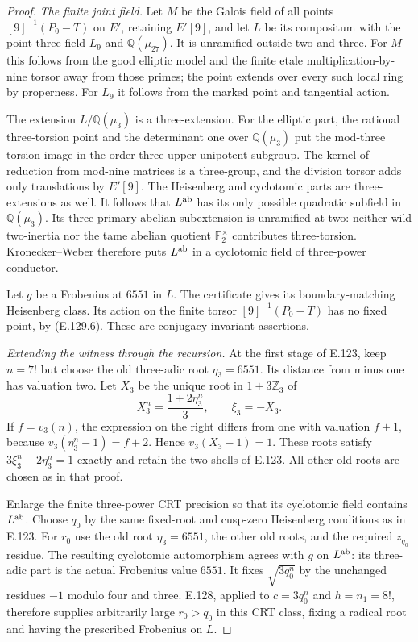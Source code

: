 \begin{proof}
\emph{The finite joint field.}
Let $M$ be the Galois field of all points
$[9]^{-1}(P_0-T)$ on $E'$, retaining $E'[9]$,
and let $L$ be its compositum with the point-three
field $L_9$ and $\mathbb Q(\mu_{27})$.
It is unramified outside two and three. For $M$
this follows from the good elliptic model and the
finite etale multiplication-by-nine torsor away
from those primes; the point extends over every
such local ring by properness. For $L_9$ it follows
from the marked point and tangential action.

The extension $L/\mathbb Q(\mu_3)$ is a
three-extension. For the elliptic part, the rational
three-torsion point and the determinant one over
$\mathbb Q(\mu_3)$ put the mod-three torsion image
in the order-three upper unipotent subgroup.
The kernel of reduction from mod-nine matrices is
a three-group, and the division torsor adds only
translations by $E'[9]$. The Heisenberg and
cyclotomic parts are three-extensions as well.
It follows that $L^{\rm ab}$ has its only possible
quadratic subfield in $\mathbb Q(\mu_3)$.
Its three-primary abelian subextension is unramified
at two: neither wild two-inertia nor the tame
abelian quotient $\mathbb F_2^\times$ contributes
three-torsion. Kronecker--Weber therefore puts
$L^{\rm ab}$ in a cyclotomic field of three-power
conductor.

Let $g$ be a Frobenius at $6551$ in $L$.
The certificate gives its boundary-matching
Heisenberg class. Its action on the finite torsor
$[9]^{-1}(P_0-T)$ has no fixed point, by (E.129.6).
These are conjugacy-invariant assertions.

\emph{Extending the witness through the recursion.}
At the first stage of E.123, keep $n=7!$ but choose
the old three-adic root $\eta_3=6551$. Its distance
from minus one has valuation two. Let $X_3$ be the
unique root in $1+3\mathbb Z_3$ of
\[
 X_3^n=\frac{1+2\eta_3^n}{3},
 \qquad \xi_3=-X_3.
\]
If $f=v_3(n)$, the expression on the right differs
from one with valuation $f+1$, because
$v_3(\eta_3^n-1)=f+2$. Hence $v_3(X_3-1)=1$.
These roots satisfy $3\xi_3^n-2\eta_3^n=1$
exactly and retain the two shells of E.123.
All other old roots are chosen as in that proof.

Enlarge the finite three-power CRT precision so
that its cyclotomic field contains $L^{\rm ab}$.
Choose $q_0$ by the same fixed-root and cusp-zero
Heisenberg conditions as in E.123. For $r_0$ use
the old root $\eta_3=6551$, the other old roots,
and the required $z_{q_0}$ residue. The resulting
cyclotomic automorphism agrees with $g$ on
$L^{\rm ab}$: its three-adic part is the actual
Frobenius value $6551$. It fixes $\sqrt{3q_0^n}$
by the unchanged residues $-1$ modulo four and
three. E.128, applied to $c=3q_0^n$ and
$h=n_1=8!$, therefore supplies arbitrarily large
$r_0>q_0$ in this CRT class, fixing a radical root
and having the prescribed Frobenius on $L$.


\end{proof}
